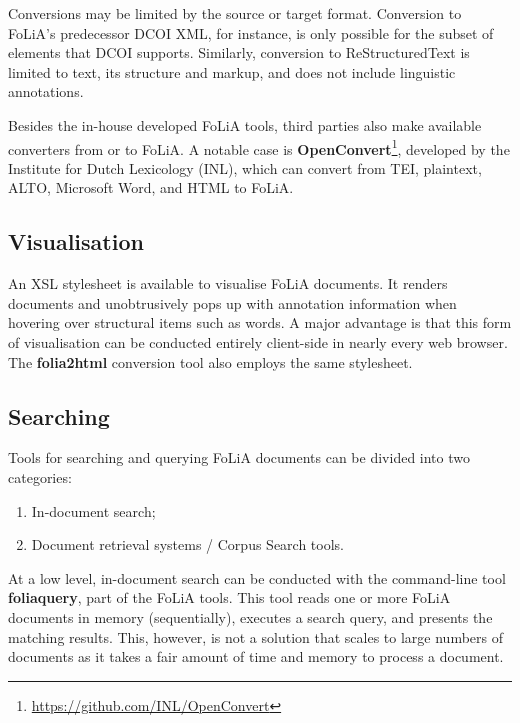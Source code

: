 \documentclass[a4paper,11pt]{article}
\begin{document}
{Conversions may be limited by the source or target format. Conversion to
FoLiA's predecessor DCOI XML, for instance, is only possible for the subset of
elements that DCOI supports. Similarly, conversion to
ReStructuredText is limited
to text, its structure and markup, and does not include linguistic annotations.

Besides the in-house developed FoLiA tools, third parties also make available
converters from or to FoLiA. A notable case is
\textbf{OpenConvert}\footnote{\url{https://github.com/INL/OpenConvert}},
developed by the Institute for Dutch Lexicology (INL), which can convert from
TEI, plaintext, ALTO, Microsoft Word, and HTML to FoLiA.

\subsection{Visualisation}

An XSL stylesheet is available to visualise FoLiA documents. It renders
documents and unobtrusively pops up with annotation information when hovering
over structural items such as words. A major advantage is that this form of
visualisation can be conducted entirely client-side in nearly every
web browser. The \textbf{folia2html} conversion tool also employs the same
stylesheet.

\subsection{Searching}

Tools for searching and querying FoLiA documents can be divided into two
categories:

\begin{enumerate}
 \item In-document search;
 \item Document retrieval systems / Corpus Search tools.
\end{enumerate}

At a low level, in-document search can be conducted with the command-line tool
\textbf{foliaquery}, part of the FoLiA tools. This tool reads one or more FoLiA
documents in memory (sequentially), executes a search query, and presents the
matching results. This, however, is not a solution that scales to large
numbers of documents as it takes a fair amount of time and memory to process a document.

}
\end{document}
